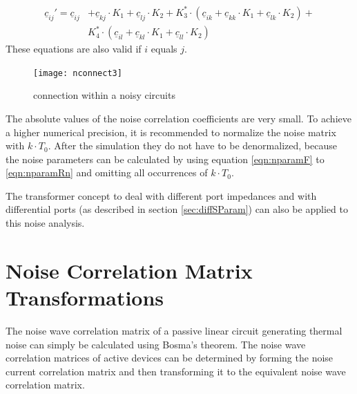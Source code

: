 \documentclass[10pt]{report}
\begin{document}
\begin{equation}
\begin{split}
\underline{c}_{ij}' = \underline{c}_{ij} &+ \underline{c}_{kj}\cdot K_1 + \underline{c}_{lj}\cdot K_2
   + K_3^*\cdot(\underline{c}_{ik} + \underline{c}_{kk}\cdot K_1 + \underline{c}_{lk}\cdot K_2) + \\
    &K_4^*\cdot(\underline{c}_{il} + \underline{c}_{kl}\cdot K_1 + \underline{c}_{ll}\cdot K_2)
\end{split}
\end{equation}
These equations are also valid if $i$ equals $j$.

\begin{figure}[ht]
\begin{center}
\texttt{[image: nconnect3]}
\end{center}
\caption{connection within a noisy circuits}
\label{fig:nconnect3}
\end{figure}
\FloatBarrier

The absolute values of the noise correlation coefficients are very
small.  To achieve a higher numerical precision, it is recommended to
normalize the noise matrix with $k\cdot T_0$. After the simulation
they do not have to be denormalized, because the noise parameters can
be calculated by using equation \eqref{eqn:nparamF} to
\eqref{eqn:nparamRn} and omitting all occurrences of $k\cdot T_0$.

\addvspace{12pt}

The transformer concept to deal with different port impedances and
with differential ports (as described in section \ref{sec:diffSParam})
can also be applied to this noise analysis.


\section{Noise Correlation Matrix Transformations}

The noise wave correlation matrix of a passive linear circuit
generating thermal noise can simply be calculated using Bosma's theorem.
The noise wave correlation matrices of active devices can be
determined by forming the noise current correlation matrix and then
transforming it to the equivalent noise wave correlation matrix.

\addvspace{12pt}
\end{document}
